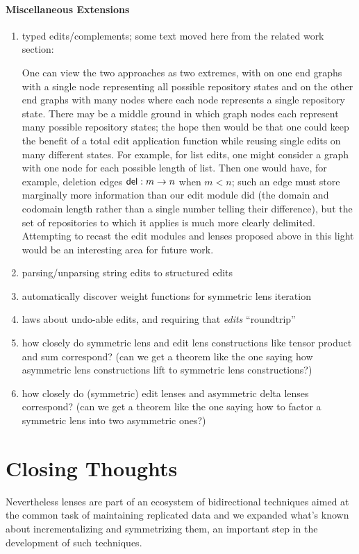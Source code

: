 \paragraph*{Miscellaneous Extensions}
\begin{enumerate}
    \item typed edits/complements; some text moved here from the related
        work section:

        One can view the two approaches as two extremes, with on one end
        graphs with a single node representing all possible repository
        states and on the other end graphs with many nodes where each node
        represents a single repository state. There may be a middle ground
        in which graph nodes each represent many possible repository states;
        the hope then would be that one could keep the benefit of a total
        edit application function while reusing single edits on many
        different states. For example, for list edits, one might consider a
        graph with one node for each possible length of list. Then one would
        have, for example, deletion edges $\mathsf{del} : m \to n$ when
        $m<n$; such an edge must store marginally more information than our
        edit module did (the domain and codomain length rather than a single
        number telling their difference), but the set of repositories to
        which it applies is much more clearly delimited. Attempting to
        recast the edit modules and lenses proposed above in this light
        would be an interesting area for future work.
    \item parsing/unparsing string edits to structured edits
    \item automatically discover weight functions for symmetric lens
        iteration
    \item laws about undo-able edits, and requiring that \emph{edits} ``roundtrip''
    \item how closely do symmetric lens and edit lens constructions like
        tensor product and sum correspond? (can we get a theorem like the
        one saying how asymmetric lens constructions lift to symmetric lens
        constructions?)
    \item how closely do (symmetric) edit lenses and asymmetric delta lenses
        correspond? (can we get a theorem like the one saying how to
        factor a symmetric lens into two asymmetric ones?)
\end{enumerate}

\section{Closing Thoughts}
\label{sec:closing}
Nevertheless lenses are part of an ecosystem of bidirectional techniques
aimed at the common task of maintaining replicated data and we expanded
what's known about incrementalizing and symmetrizing them, an important step
in the development of such techniques.
